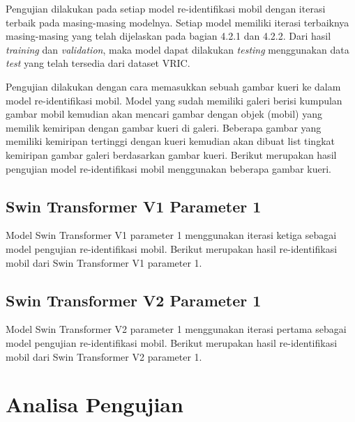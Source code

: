 Pengujian dilakukan pada setiap model re-identifikasi mobil dengan iterasi terbaik pada masing-masing modelnya. Setiap 
model memiliki iterasi terbaiknya masing-masing yang telah dijelaskan pada bagian 4.2.1 dan 4.2.2. Dari hasil \emph{training} 
dan \emph{validation}, maka model dapat dilakukan \emph{testing} menggunakan data \emph{test} yang telah tersedia dari 
dataset VRIC.

Pengujian dilakukan dengan cara memasukkan sebuah gambar kueri ke dalam model re-identifikasi mobil. Model yang sudah memiliki 
galeri berisi kumpulan gambar mobil kemudian akan mencari gambar dengan objek (mobil) yang memilik kemiripan dengan gambar 
kueri di galeri. Beberapa gambar yang memiliki kemiripan tertinggi dengan kueri kemudian akan dibuat list tingkat kemiripan 
gambar galeri berdasarkan gambar kueri. Berikut merupakan hasil pengujian model re-identifikasi mobil menggunakan beberapa 
gambar kueri.

\subsection{Swin Transformer V1 Parameter 1}

Model Swin Transformer V1 parameter 1 menggunakan iterasi ketiga sebagai model pengujian re-identifikasi mobil. Berikut 
merupakan hasil re-identifikasi mobil dari Swin Transformer V1 parameter 1.

\subsection{Swin Transformer V2 Parameter 1}

Model Swin Transformer V2 parameter 1 menggunakan iterasi pertama sebagai model pengujian re-identifikasi mobil. Berikut 
merupakan hasil re-identifikasi mobil dari Swin Transformer V2 parameter 1.

\section{Analisa Pengujian}
\label{sec:analisapengujian}



